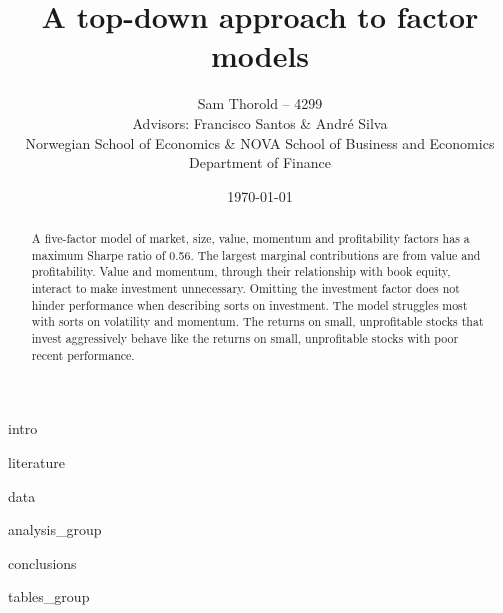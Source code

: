 \documentclass[a4paper, 12pt]{article}
\title{
  {A top-down approach to factor models}\\
}
\author{
  {Sam Thorold -- 4299}\\[1cm]
  {\normalsize Advisors: \large Francisco Santos \&
                                Andr\'e Silva}\\
  {\normalsize Norwegian School of Economics \&
               NOVA School of Business and Economics}\\
  {\normalsize Department of Finance}
}
\date{\today}
\begin{document}
\maketitle


\begin{abstract}
  A five-factor model of
  market, size, value, momentum and profitability factors
  has a maximum Sharpe ratio of 0.56.
  The largest marginal contributions are from value and profitability.
  Value and momentum, through their relationship with book equity,
  interact to make investment unnecessary.
  Omitting the investment factor does not hinder performance when describing
  sorts on investment.
  The model struggles most with sorts on volatility and momentum.
  The returns on small, unprofitable stocks that invest aggressively behave
  like the returns on small, unprofitable stocks with poor recent performance.
\end{abstract}

\pagebreak

{intro}

{literature}

{data}

{analysis_group}

{conclusions}


\printbibliography

\appendix

{tables_group}

\end{document}
